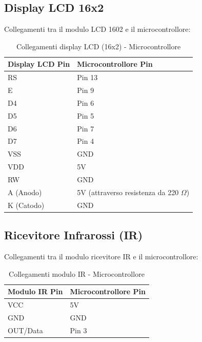 \documentclass[a4paper, 12pt]{article}
\begin{document}
\subsection{Display LCD 16x2}
\label{subsec:setup-lcd}
Collegamenti tra il modulo LCD 1602 e il microcontrollore:

\begin{table}[H]
    \centering
    \caption{Collegamenti display LCD (16x2) - Microcontrollore}
    \label{tab:lcd-16x2-connections}
    \begin{tabular}{ll}
        \toprule
        \textbf{Display LCD Pin} & \textbf{Microcontrollore Pin}                \\
        \midrule
        RS               & Pin 13                                       \\
        E                & Pin 9                                        \\
        D4               & Pin 6                                        \\
        D5               & Pin 5                                        \\
        D6               & Pin 7                                        \\
        D7               & Pin 4                                        \\
        VSS              & GND                                          \\
        VDD              & 5V                                           \\
        RW               & GND                                          \\
        A (Anodo)        & 5V (attraverso resistenza da 220 \(\Omega\)) \\
        K (Catodo)       & GND                                          \\
        \bottomrule
    \end{tabular}
\end{table}

\subsection{Ricevitore Infrarossi (IR)}
\label{subsec:setup-ir}
Collegamenti tra il modulo ricevitore IR e il microcontrollore:

\begin{table}[H]
    \centering
    \caption{Collegamenti modulo IR - Microcontrollore}
    \label{tab:ir-receiver-connections}
    \begin{tabular}{ll}
        \toprule
        \textbf{Modulo IR Pin} & \textbf{Microcontrollore Pin} \\
        \midrule
        VCC             & 5V                            \\
        GND             & GND                           \\
        OUT/Data        & Pin 3                         \\
        \bottomrule
    \end{tabular}
\end{table}
\end{document}
